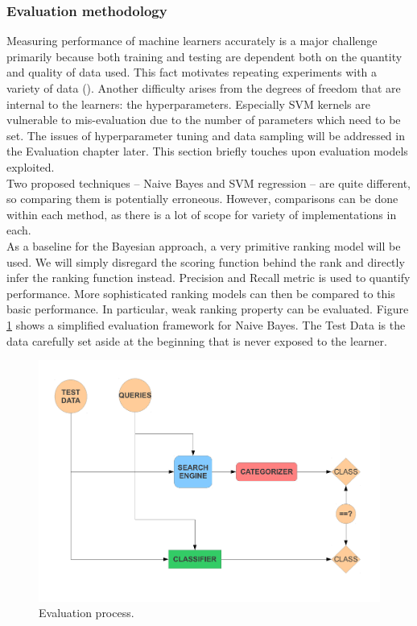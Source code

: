 \documentclass[11pt,twoside,notitlepage]{report}
\begin{document}
\subsubsection*{Evaluation methodology}
Measuring performance of machine learners accurately is a major challenge
primarily because both training and testing are dependent both on the quantity
and quality of data used. This fact motivates repeating experiments with a
variety of data (). Another difficulty arises from the
degrees of freedom that are internal to the learners: the hyperparameters.
Especially SVM kernels are vulnerable to mis-evaluation due to the number of
parameters which need to be set. The issues of hyperparameter tuning and data
sampling will be addressed in the Evaluation chapter later. This section
briefly touches upon evaluation models exploited.\\
Two proposed techniques -- Naive Bayes and SVM regression -- are quite different, so
comparing them is potentially erroneous. However, comparisons can be done
within each method, as there is a lot of scope for variety of implementations
in each.\\
As a baseline for the Bayesian approach, a very primitive ranking model will be
used. We will simply disregard the scoring function behind the rank and
directly infer the ranking function instead. Precision and Recall metric is
used to quantify performance. More sophisticated ranking models
can then be compared to this basic performance. In particular, weak ranking
property can be evaluated.
Figure \ref{eval} shows a simplified evaluation framework for Naive Bayes.  The Test Data
is the data carefully set aside at the beginning that is never exposed to the
learner. 
\begin{figure}[h]
\centering
\includegraphics[scale=0.5]{figs/eval.pdf}
\caption{Evaluation process. }
\label{eval}
\end{figure}
\end{document}

